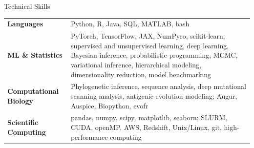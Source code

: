 \documentclass{resume} %
\begin{document}
\begin{rSection}{Technical Skills}

    \begin{tabular}{ @{} >{\bfseries}l @{\hspace{3ex}} p{} @{} }
        Languages & Python, R, Java, SQL, MATLAB, bash \\
        ML \& Statistics & PyTorch, TensorFlow, JAX, NumPyro, scikit-learn; supervised and unsupervised learning, deep learning, Bayesian inference, probabilistic programming, MCMC, variational inference, hierarchical modeling, dimensionality reduction, model benchmarking \\
        Computational Biology & Phylogenetic inference, sequence analysis, deep mutational scanning analysis, antigenic evolution modeling; Augur, Auspice, Biopython, evofr \\
        Scientific Computing & pandas, numpy, scipy, matplotlib, seaborn; SLURM, CUDA, openMP, AWS, Redshift, Unix/Linux, git, high-performance computing
    \end{tabular}

\end{rSection}

\end{document}
